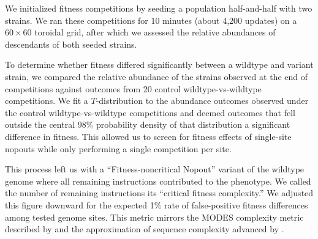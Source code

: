 We initialized fitness competitions by seeding a population half-and-half with two strains.
We ran these competitions for 10 minutes (about 4,200 updates) on a $60\times60$ toroidal grid, after which we assessed the relative abundances of descendants of both seeded strains.

To determine whether fitness differed significantly between a wildtype and variant strain, we compared the relative abundance of the strains observed at the end of competitions against outcomes from 20 control wildtype-vs-wildtype competitions.
We fit a $T$-distribution to the abundance outcomes observed under the control wildtype-vs-wildtype competitions and deemed outcomes that fell outside the central 98\% probability density of that distribution a significant difference in fitness.
This allowed us to screen for fitness effects of single-site nopouts while only performing a single competition per site.

This process left us with a ``Fitness-noncritical Nopout'' variant of the wildtype genome where all remaining instructions contributed to the phenotype.
We called the number of remaining instructions its ``critical fitness complexity.''
We adjusted this figure downward for the expected 1\% rate of false-positive fitness differences among tested genome sites.
This metric mirrors the MODES complexity metric described by \citet{dolson2019modes} and the approximation of sequence complexity advanced by \citet{adami2000evolution}.




